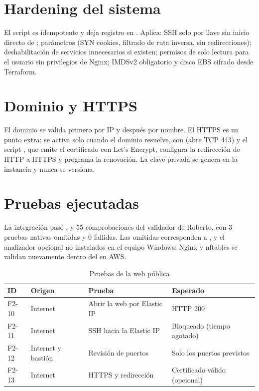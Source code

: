 \section{Hardening del sistema}

El script  es idempotente y deja registro en
. Aplica: SSH solo por llave sin inicio directo de
; parámetros  (SYN cookies, filtrado de ruta inversa, sin redirecciones);
deshabilitación de servicios innecesarios si existen; permisos de solo lectura para el
usuario sin privilegios de Nginx; IMDSv2 obligatorio y disco EBS cifrado desde Terraform.

\section{Dominio y HTTPS}

El dominio se valida primero por IP y después por nombre. El HTTPS es un punto extra: se
activa solo cuando el dominio resuelve, con  (abre TCP 443) y el
script , que emite el certificado con Let's Encrypt, configura la
redirección de HTTP a HTTPS y programa la renovación. La clave privada se genera en la
instancia y nunca se versiona.

\section{Pruebas ejecutadas}

\begin{infobox}
La integración pasó ,  y 55 comprobaciones del
validador de Roberto, con 3 pruebas nativas omitidas y 0 fallidas. Las omitidas corresponden a
,  y el analizador opcional  no instalados en el
equipo Windows; Nginx y nftables se validan nuevamente dentro del  en AWS.
\end{infobox}

\begin{table}[H]
\centering
\caption{Pruebas de la web pública}
\small
\begin{tabularx}{\textwidth}{>{\raggedright\arraybackslash}p{1.6cm}p{3.2cm}p{4.5cm}Y}
\toprule
\textbf{ID} & \textbf{Origen} & \textbf{Prueba} & \textbf{Esperado} \\
\midrule
F2-10 & Internet & Abrir la web por Elastic IP & HTTP 200 \\
F2-11 & Internet & SSH hacia la Elastic IP & Bloqueado (tiempo agotado) \\
F2-12 & Internet y bastión & Revisión de puertos & Solo los puertos previstos \\
F2-13 & Internet & HTTPS y redirección & Certificado válido (opcional) \\
\bottomrule
\end{tabularx}
\end{table}


